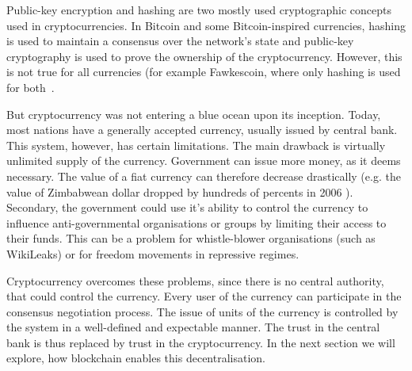 Public-key encryption and hashing are two mostly used cryptographic concepts used in cryptocurrencies. In Bitcoin and some Bitcoin-inspired currencies, hashing is used to maintain a consensus over the network's state and public-key cryptography is used to prove the ownership of the cryptocurrency. However, this is not true for all currencies (for example Fawkescoin, where only hashing is used for both~\cite{Bonneau2014FawkescoinCryptography}.

But cryptocurrency was not entering a blue ocean upon its inception. Today, most nations have a generally accepted currency, usually issued by central bank. This system, however, has certain limitations. The main drawback is virtually unlimited supply of the currency. Government can issue more money, as it deems necessary. The value of a fiat currency can therefore decrease drastically (e.g. the value of Zimbabwean dollar dropped by hundreds of percents in 2006 \footnotemark ). Secondary, the government could use it's ability to control the currency to influence anti-governmental organisations or groups by limiting their access to their funds. This can be a problem for whistle-blower organisations (such as WikiLeaks) or for freedom movements in repressive regimes.
% 

Cryptocurrency overcomes these problems, since there is no central authority, that could control the currency. Every user of the currency can participate in the consensus negotiation process. The issue of units of the currency is controlled by the system in a well-defined and expectable manner. The trust in the central bank is thus replaced by trust in the cryptocurrency. In the next section we will explore, how blockchain enables this decentralisation.